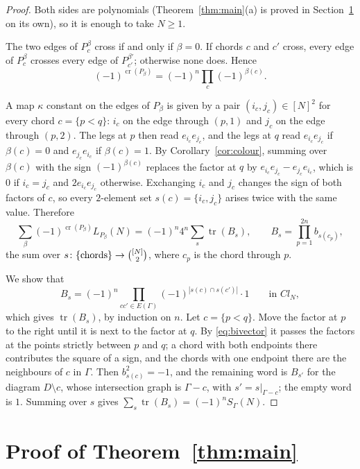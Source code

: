 \documentclass[11pt,a4paper,reqno]{amsart}
\theoremstyle{definition}
\newcommand{\tr}{\operatorname{tr}}
\newcommand{\cro}{\operatorname{cr}}
\newcommand{\binomset}[2]{\tbinom{#1}{#2}}
\begin{document}
\begin{proof}
Both sides are polynomials (Theorem~\ref{thm:main}(a) is proved in Section~\ref{sec:proof} on its own), so it is enough to take $N\ge1$.

The two edges of $P_c^\beta$ cross if and only if $\beta=0$. If chords $c$ and $c'$ cross, every edge of $P_c^\beta$ crosses every edge of $P_{c'}^{\beta'}$; otherwise none does. Hence
\[
(-1)^{\cro(P_\beta)}=(-1)^n\prod_c(-1)^{\beta(c)}.
\]

A map $\kappa$ constant on the edges of $P_\beta$ is given by a pair $(i_c,j_c)\in[N]^2$ for every chord $c=\{p<q\}$: $i_c$ on the edge through $(p,1)$ and $j_c$ on the edge through $(p,2)$. The legs at $p$ then read $e_{i_c}e_{j_c}$, and the legs at $q$ read $e_{i_c}e_{j_c}$ if $\beta(c)=0$ and $e_{j_c}e_{i_c}$ if $\beta(c)=1$. By Corollary~\ref{cor:colour}, summing over $\beta(c)$ with the sign $(-1)^{\beta(c)}$ replaces the factor at $q$ by $e_{i_c}e_{j_c}-e_{j_c}e_{i_c}$, which is $0$ if $i_c=j_c$ and $2e_{i_c}e_{j_c}$ otherwise. Exchanging $i_c$ and $j_c$ changes the sign of both factors of $c$, so every $2$-element set $s(c)=\{i_c,j_c\}$ arises twice with the same value. Therefore
\[
\sum_\beta(-1)^{\cro(P_\beta)}L_{P_\beta}(N)=(-1)^n4^n\sum_{s}\tr(B_s),\qquad B_s=\prod_{p=1}^{2n}b_{s(c_p)},
\]
the sum over $s\colon\{\text{chords}\}\to\binomset{[N]}{2}$, where $c_p$ is the chord through $p$.

We show that
\begin{equation}\label{eq:Bs}
B_s=(-1)^n\prod_{cc'\in E(\Gamma)}(-1)^{|s(c)\cap s(c')|}\cdot1\qquad\text{in }Cl_N,
\end{equation}
which gives $\tr(B_s)$, by induction on $n$. Let $c=\{p<q\}$. Move the factor at $p$ to the right until it is next to the factor at $q$. By \eqref{eq:bivector} it passes the factors at the points strictly between $p$ and $q$; a chord with both endpoints there contributes the square of a sign, and the chords with one endpoint there are the neighbours of $c$ in $\Gamma$. Then $b_{s(c)}^2=-1$, and the remaining word is $B_{s'}$ for the diagram $D\setminus c$, whose intersection graph is $\Gamma-c$, with $s'=s|_{\Gamma-c}$; the empty word is $1$. Summing over $s$ gives $\sum_s\tr(B_s)=(-1)^nS_\Gamma(N)$.
\end{proof}

\section{Proof of Theorem~\ref{thm:main}}\label{sec:proof}
\end{document}
